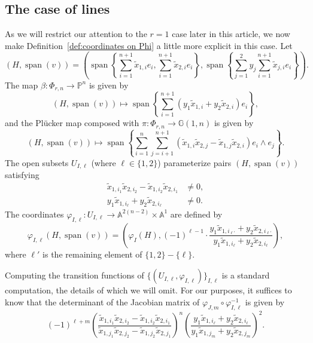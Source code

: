 \documentclass[12pt]{amsart}
\numberwithin{equation}{section}
\theoremstyle{plain}
\theoremstyle{definition}
\newcommand{\mb}[1]{\mathbb{#1}}
\newcommand{\vphi}{\varphi}
\newcommand{\spn}{\operatorname{span}}
\begin{document}
\subsection{The case of lines}
As we will restrict our attention to the $r=1$ case later in this article, we now make Definition~\ref{def:coordinates on Phi} a little more explicit in this case. Let
\[(H,\spn(v))=\left(\spn\left\{\sum_{i=1}^{n+1}\tilde{x}_{1,i}e_i,\sum_{i=1}^{n+1}\tilde{x}_{2,i}e_i\right\},\spn\left\{\sum_{j=1}^2 y_j\sum_{i=1}^{n+1}\tilde{x}_{j,i}e_i\right\}\right).\]
The map $\beta\colon \Phi_{r,n}\to\mb{P}^n$ is given by
\[(H,\spn(v))\mapsto\spn\left\{\sum_{i=1}^{n+1}(y_1\tilde{x}_{1,i}+y_2\tilde{x}_{2,i})e_i\right\},\]
and the Pl\"ucker map composed with $\pi\colon \Phi_{r,n}\to\mb{G}(1,n)$ is given by
\[(H,\spn(v))\longmapsto\spn\left\{\sum_{i=1}^n\sum_{j=i+1}^{n+1}(\tilde{x}_{1,i}\tilde{x}_{2,j}-\tilde{x}_{1,j}\tilde{x}_{2,i})e_i\wedge e_j\right\}.\]
The open subsets $U_{I,\ell}$ (where $\ell\in\{1,2\}$) parameterize pairs $(H,\spn(v))$ satisfying
\begin{align*}
    \tilde{x}_{1,i_1}\tilde{x}_{2,i_2}-\tilde{x}_{1,i_2}\tilde{x}_{2,i_1}&\neq 0,\\
    y_1\tilde{x}_{1,i_\ell}+y_2\tilde{x}_{2,i_\ell}&\neq 0.
\end{align*}
The coordinates $\vphi_{I,\ell}\colon U_{I,\ell}\to\mb{A}^{2(n-2)}\times\mb{A}^1$ are defined by
\[\vphi_{I,\ell}(H,\spn(v))=\left(\vphi_I(H),(-1)^{\ell-1}\cdot\frac{y_1\tilde{x}_{1,i_{\ell'}}+y_2\tilde{x}_{2,i_{\ell'}}}{y_1\tilde{x}_{1,i_\ell}+y_2\tilde{x}_{2,i_\ell}}\right),\]
where $\ell'$ is the remaining element of $\{1,2\}-\{\ell\}$.

Computing the transition functions of $\{(U_{I,\ell},\vphi_{I,\ell})\}_{I,\ell}$ is a standard computation, the details of which we will omit. For our purposes, it suffices to know that the determinant of the Jacobian matrix of $\vphi_{J,m}\circ\vphi_{I,\ell}^{-1}$ is given by
\begin{equation}\label{eq:jacobian of transition}
(-1)^{\ell+m}\left(\frac{\tilde{x}_{1,i_1}\tilde{x}_{2,i_2}-\tilde{x}_{1,i_2}\tilde{x}_{2,i_1}}{\tilde{x}_{1,j_1}\tilde{x}_{2,j_2}-\tilde{x}_{1,j_2}\tilde{x}_{2,j_1}}\right)^n\left(\frac{y_1\tilde{x}_{1,i_\ell}+y_2\tilde{x}_{2,i_\ell}}{y_1\tilde{x}_{1,j_m}+y_2\tilde{x}_{2,j_m}}\right)^2.
\end{equation}
\end{document}
